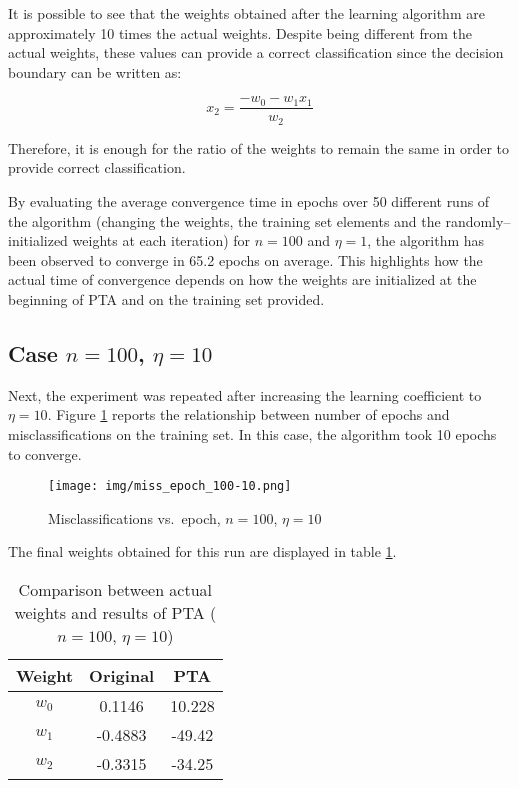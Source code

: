 \documentclass[12pt]{article}
\begin{document}
It is possible to see that the weights obtained after the learning algorithm are approximately 10 times the actual weights.
Despite being different from the actual weights, these values can provide a correct classification since the decision boundary can be written as:

\begin{equation}
    x_2 = \frac{-w_0 - w_1 x_1}{w_2}
\end{equation}

Therefore, it is enough for the ratio of the weights to remain the same in order to provide correct classification.

By evaluating the average convergence time in epochs over 50 different runs of the algorithm (changing the weights, the training set elements and the randomly–initialized weights at each iteration) for $n=100$ and $\eta=1$, the algorithm has been observed to converge in 65.2 epochs on average.
This highlights how the actual time of convergence depends on how the weights are initialized at the beginning of PTA and on the training set provided.

\subsection{Case $n=100$, $\eta=10$}
\label{sec:100-10}

Next, the experiment was repeated after increasing the learning coefficient to $\eta = 10$.
Figure \ref{fig:100-10-1} reports the relationship between number of epochs and misclassifications on the training set.
In this case, the algorithm took 10 epochs to converge.

\begin{figure}[h]
    \centering
    \texttt{[image: img/miss\_epoch\_100-10.png]}
    \caption{Misclassifications vs.\ epoch, $n=100$, $\eta=10$}
    \label{fig:100-10-1}
\end{figure}

The final weights obtained for this run are displayed in table \ref{tab:02}.

\begin{table}[h]
    \centering
    \begin{tabular}{|c|c|c|}
        \hline
        Weight & \textbf{Original} & \textbf{PTA} \\ 
        \hline
        \hline
        $w_0$ & 0.1146 & 10.228 \\
        \hline
        $w_1$ & -0.4883 & -49.42 \\
        \hline
        $w_2$ & -0.3315 & -34.25 \\
        \hline
    \end{tabular}
    \caption{Comparison between actual weights and results of PTA ($n=100$, $\eta=10$)}
    \label{tab:02}
\end{table}
\end{document}
